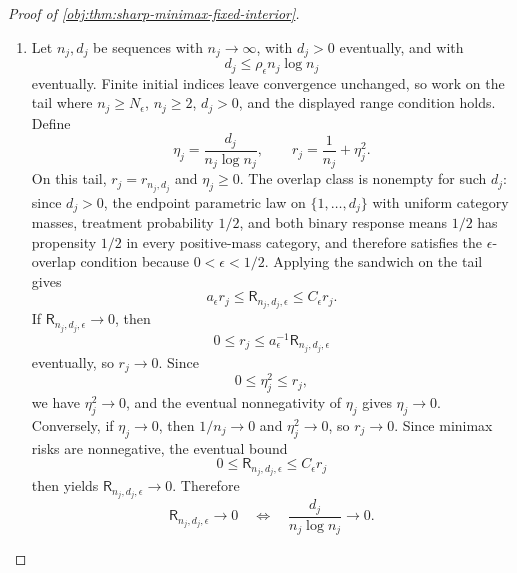 \begin{proof}[Proof of \cref{obj:thm:sharp-minimax-fixed-interior}]
\begin{enumerate}
\item Let \(n_j,d_j\) be sequences with \(n_j\to\infty\), with \(d_j>0\) eventually, and with
\[
d_j\le\rho_\epsilon n_j\log n_j
\]
eventually.  Finite initial indices leave convergence unchanged, so work on the tail where
\(n_j\ge N_\epsilon\), \(n_j\ge2\), \(d_j>0\), and the displayed range condition holds.  Define
\[
\eta_j=\frac{d_j}{n_j\log n_j},
\qquad
r_j=\frac1{n_j}+\eta_j^2.
\]
On this tail, \(r_j=r_{n_j,d_j}\) and \(\eta_j\ge0\).  The overlap class is nonempty for
such \(d_j\): since \(d_j>0\), the endpoint parametric law on \(\{1,\ldots,d_j\}\) with
uniform category masses, treatment probability \(1/2\), and both binary response means
\(1/2\) has propensity \(1/2\) in every positive-mass category, and therefore satisfies the
\(\epsilon\)-overlap condition because \(0<\epsilon<1/2\).  Applying the sandwich on the tail
gives
\[
a_\epsilon r_j
\le
\mathsf R_{n_j,d_j,\epsilon}
\le
C_\epsilon r_j .
\]
If \(\mathsf R_{n_j,d_j,\epsilon}\to0\), then
\[
0\le r_j\le a_\epsilon^{-1}\mathsf R_{n_j,d_j,\epsilon}
\]
eventually, so \(r_j\to0\).  Since
\[
0\le \eta_j^2\le r_j,
\]
we have \(\eta_j^2\to0\), and the eventual nonnegativity of \(\eta_j\) gives
\(\eta_j\to0\).  Conversely, if \(\eta_j\to0\), then \(1/n_j\to0\) and
\(\eta_j^2\to0\), so \(r_j\to0\).  Since minimax risks are nonnegative, the eventual bound
\[
0\le
\mathsf R_{n_j,d_j,\epsilon}
\le
C_\epsilon r_j
\]
then yields \(\mathsf R_{n_j,d_j,\epsilon}\to0\).  Therefore
\[
\mathsf R_{n_j,d_j,\epsilon}\to0
\quad\Longleftrightarrow\quad
\frac{d_j}{n_j\log n_j}\to0 .
\]
\end{enumerate}
\end{proof}

